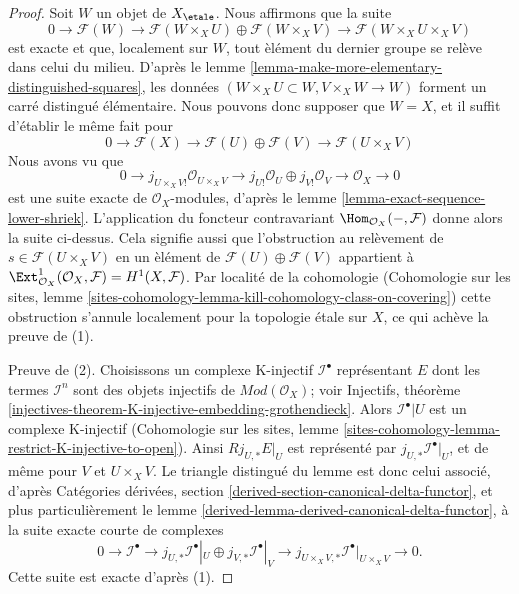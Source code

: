 \begin{proof}
Soit $W$ un objet de $X_\etale$. Nous affirmons que la suite
$$
0 \to
\mathcal{F}(W) \to
\mathcal{F}(W \times_X U) \oplus \mathcal{F}(W \times_X V) \to
\mathcal{F}(W \times_X U \times_X V)
$$
est exacte et que, localement sur $W$, tout \`el\'ement du dernier groupe
se rel\`eve dans celui du milieu. D'apr\`es le
lemme \ref{lemma-make-more-elementary-distinguished-squares}, les donn\'ees
$(W \times_X U \subset W, V \times_X W \to W)$ forment un carr\'e distingu\'e
\'el\'ementaire. Nous pouvons donc supposer que $W = X$, et il suffit
d'\'etablir le m\^eme fait pour
$$
0 \to
\mathcal{F}(X) \to
\mathcal{F}(U) \oplus \mathcal{F}(V) \to
\mathcal{F}(U \times_X V)
$$
Nous avons vu que
$$
0 \to j_{U \times_X V!}\mathcal{O}_{U \times_X V}
\to j_{U!}\mathcal{O}_U \oplus
j_{V!}\mathcal{O}_V \to
\mathcal{O}_X \to 0
$$
est une suite exacte de $\mathcal{O}_X$-modules, d'apr\`es le
lemme \ref{lemma-exact-sequence-lower-shriek}. L'application du foncteur
contravariant $\Hom_{\mathcal{O}_X}(- , \mathcal{F})$ donne alors la suite
ci-dessus. Cela signifie aussi que l'obstruction au rel\`evement de
$s \in \mathcal{F}(U \times_X V)$ en un \`el\'ement de
$\mathcal{F}(U) \oplus \mathcal{F}(V)$ appartient \`a
$\Ext^1_{\mathcal{O}_X}(\mathcal{O}_X, \mathcal{F}) =
H^1(X, \mathcal{F})$. Par localit\'e de la cohomologie (Cohomologie sur les
sites, lemme
\ref{sites-cohomology-lemma-kill-cohomology-class-on-covering})
cette obstruction s'annule localement pour la topologie \'etale sur $X$, ce
qui ach\`eve la preuve de (1).

\medskip\noindent
Preuve de (2). Choisissons un complexe K-injectif
$\mathcal{I}^\bullet$ repr\'esentant $E$ dont les termes $\mathcal{I}^n$
sont des objets injectifs de $\textit{Mod}(\mathcal{O}_X)$; voir Injectifs,
th\'eor\`eme
\ref{injectives-theorem-K-injective-embedding-grothendieck}.
Alors $\mathcal{I}^\bullet|U$ est un complexe K-injectif (Cohomologie sur
les sites, lemme
\ref{sites-cohomology-lemma-restrict-K-injective-to-open}).
Ainsi $Rj_{U, *}E|_U$ est repr\'esent\'e par
$j_{U, *}\mathcal{I}^\bullet|_U$, et de m\^eme pour $V$ et $U \times_X V$.
Le triangle distingu\'e du lemme est donc celui associ\'e, d'apr\`es
Cat\'egories d\'eriv\'ees, section
\ref{derived-section-canonical-delta-functor}, et plus particuli\`erement le
lemme \ref{derived-lemma-derived-canonical-delta-functor}, \`a la suite exacte
courte de complexes
$$
0 \to
\mathcal{I}^\bullet \to
j_{U, *}\mathcal{I}^\bullet|_U \oplus j_{V, *}\mathcal{I}^\bullet|_V \to
j_{U \times_X V, *}\mathcal{I}^\bullet|_{U \times_X V} \to
0.
$$
Cette suite est exacte d'apr\`es (1).
\end{proof}

